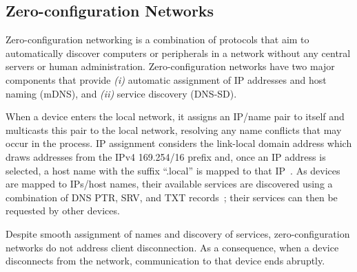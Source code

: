 \subsection{Zero-configuration Networks}
\label{sec:zeroconf}

Zero-configuration networking is a combination of protocols that aim to automatically discover computers or peripherals in a network without any central servers or human administration. Zero-configuration networks have two major components that provide {\it (i)} automatic assignment of IP addresses and host naming (mDNS), and {\it (ii)} service discovery (DNS-SD).

When a device enters the local network, it assigns an IP/name pair to itself and  multicasts this pair to the local network, resolving any name conflicts that may occur in the process. IP assignment considers the link-local domain address which draws addresses from the IPv4 169.254/16 prefix and, once an IP address is selected, a host name with the suffix ``.local'' is mapped to that IP~\cite{rfc6762}. As devices are mapped to IPs/host names, their available services are discovered using a combination of DNS PTR, SRV, and TXT records~\cite{rfc6763}; their services can then be requested by other devices.

Despite smooth assignment of names and discovery of services, zero-configuration networks do not address client disconnection. As a consequence, when a device disconnects from the network, communication to that device ends abruptly.